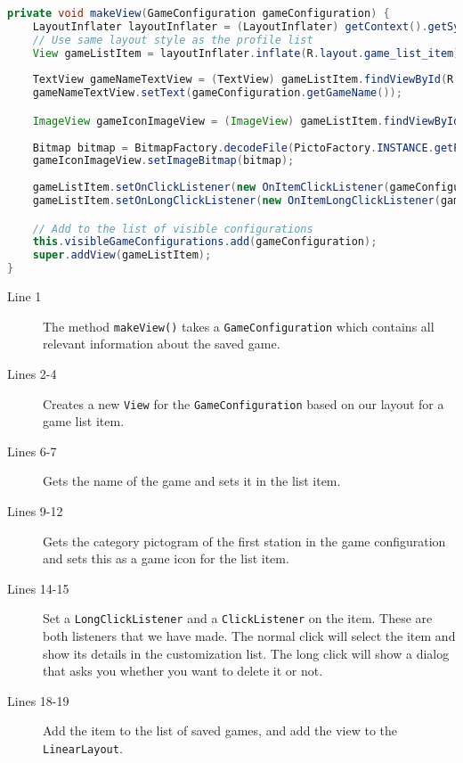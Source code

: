 \begin{lstlisting}[language=java,firstnumber=1,caption={The method to create a list item.},label=lst:makeview]
private void makeView(GameConfiguration gameConfiguration) {
    LayoutInflater layoutInflater = (LayoutInflater) getContext().getSystemService(Context.LAYOUT_INFLATER_SERVICE);
    // Use same layout style as the profile list
    View gameListItem = layoutInflater.inflate(R.layout.game_list_item);
    
    TextView gameNameTextView = (TextView) gameListItem.findViewById(R.id.gameName);
    gameNameTextView.setText(gameConfiguration.getGameName());

    ImageView gameIconImageView = (ImageView) gameListItem.findViewById(R.id.gameIcon);
    
    Bitmap bitmap = BitmapFactory.decodeFile(PictoFactory.INSTANCE.getPictogram(super.getContext(),gameConfiguration.getStation(0).getCategory()).getImagePath());
    gameIconImageView.setImageBitmap(bitmap);
    
    gameListItem.setOnClickListener(new OnItemClickListener(gameConfiguration));
    gameListItem.setOnLongClickListener(new OnItemLongClickListener(gameConfiguration));

    // Add to the list of visible configurations
    this.visibleGameConfigurations.add(gameConfiguration);
    super.addView(gameListItem);
}
\end{lstlisting}
\begin{description}
\item[Line 1] The method \lstinline|makeView()| takes a \lstinline|GameConfiguration| which contains all relevant information about the saved game.
\item[Lines 2-4] Creates a new \lstinline|View| for the \lstinline|GameConfiguration| based on our layout for a game list item.
\item[Lines 6-7] Gets the name of the game and sets it in the list item.
\item[Lines 9-12] Gets the category pictogram of the first station in the game configuration and sets this as a game icon for the list item.
\item[Lines 14-15] Set a \lstinline|LongClickListener| and a \lstinline|ClickListener| on the item. These are both listeners that we have made. The normal click will select the item and show its details in the customization list. The long click will show a dialog that asks you whether you want to delete it or not.
\item[Lines 18-19] Add the item to the list of saved games, and add the view to the \lstinline|LinearLayout|.
\end{description}
